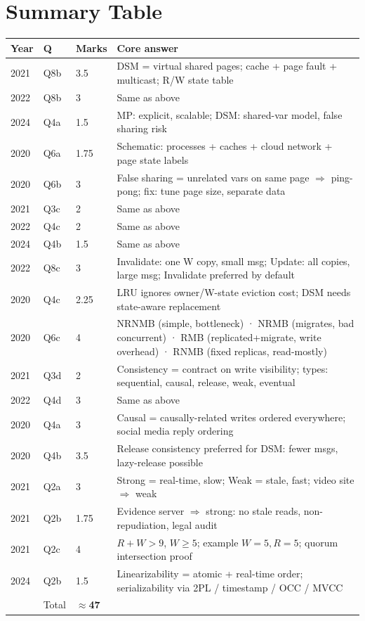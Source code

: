 \documentclass[12pt,a4paper]{article}
\begin{document}
\section{Summary Table}

\begin{center}
\begin{tabular}{@{}llll@{}}
\toprule
Year & Q & Marks & Core answer \\
\midrule
2021 & Q8b & 3.5 & DSM = virtual shared pages; cache + page fault + multicast; R/W state table \\
2022 & Q8b & 3 & Same as above \\
2024 & Q4a & 1.5 & MP: explicit, scalable; DSM: shared-var model, false sharing risk \\
2020 & Q6a & 1.75 & Schematic: processes + caches + cloud network + page state labels \\
2020 & Q6b & 3 & False sharing = unrelated vars on same page $\Rightarrow$ ping-pong; fix: tune page size, separate data \\
2021 & Q3c & 2 & Same as above \\
2022 & Q4c & 2 & Same as above \\
2024 & Q4b & 1.5 & Same as above \\
2022 & Q8c & 3 & Invalidate: one W copy, small msg; Update: all copies, large msg; Invalidate preferred by default \\
2020 & Q4c & 2.25 & LRU ignores owner/W-state eviction cost; DSM needs state-aware replacement \\
2020 & Q6c & 4 & NRNMB (simple, bottleneck) · NRMB (migrates, bad concurrent) · RMB (replicated+migrate, write overhead) · RNMB (fixed replicas, read-mostly) \\
2021 & Q3d & 2 & Consistency = contract on write visibility; types: sequential, causal, release, weak, eventual \\
2022 & Q4d & 3 & Same as above \\
2020 & Q4a & 3 & Causal = causally-related writes ordered everywhere; social media reply ordering \\
2020 & Q4b & 3.5 & Release consistency preferred for DSM: fewer msgs, lazy-release possible \\
2021 & Q2a & 3 & Strong = real-time, slow; Weak = stale, fast; video site $\Rightarrow$ weak \\
2021 & Q2b & 1.75 & Evidence server $\Rightarrow$ strong: no stale reads, non-repudiation, legal audit \\
2021 & Q2c & 4 & $R + W > 9$, $W \geq 5$; example $W=5, R=5$; quorum intersection proof \\
2024 & Q2b & 1.5 & Linearizability = atomic + real-time order; serializability via 2PL / timestamp / OCC / MVCC \\
\midrule
 & Total & \textbf{$\approx$47} & \\
\bottomrule
\end{tabular}
\end{center}
\end{document}

